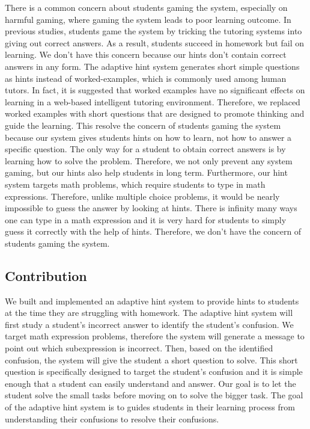 \documentclass{llncs}
\begin{document}
There is a common concern about students gaming the system, especially on harmful gaming, where gaming the system leads to poor learning outcome\cite{Baker2004}\cite{Baker2005}. In previous studies, students game the system by tricking the tutoring systems into giving out correct answers\cite{Baker2004Off-task}. As a result, students succeed in homework but fail on learning. We don't have this concern because our hints don't contain correct answers in any form. The adaptive hint system generates short simple questions as hints instead of worked-examples, which is commonly used among human tutors\cite{Atkinson2000}. In fact, it is suggested that worked examples have no significant effects on learning in a web-based intelligent tutoring environment\cite{McLaren2006}. Therefore, we replaced worked examples with short questions that are designed to promote thinking and guide the learning. This resolve the concern of students gaming the system because our system gives students hints on how to learn, not how to answer a specific question. The only way for a student to obtain correct answers is by learning how to solve the problem. Therefore, we not only prevent any system gaming, but our hints also help students in long term. Furthermore, our hint system targets math problems, which require students to type in math expressions. Therefore, unlike multiple choice problems, it would be nearly impossible to guess the answer by looking at hints. There is infinity many ways one can type in a math expression and it is very hard for students to simply guess it correctly with the help of hints. Therefore, we don't have the concern of students gaming the system.

\subsection*{Contribution}
We built and implemented an adaptive hint system to provide hints to students at the time they are struggling with homework. The adaptive hint system will first study a student's incorrect answer to identify the student's confusion. We target math expression problems, therefore the system will generate a message to point out which subexpression is incorrect. Then, based on the identified confusion, the system will give the student a short question to solve. This short question is specifically designed to target the student's confusion and it is simple enough that a student can easily understand and answer. Our goal is to let the student solve the small tasks before moving on to solve the bigger task. The goal of the adaptive hint system is to guides students in their learning process from understanding their confusions to resolve their confusions.
\end{document}
